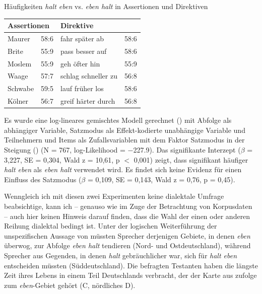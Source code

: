 \begin{exe}
        \ex\label{637} Häufigkeiten \textit{halt eben} vs. \textit{eben halt} in Assertionen und Direktiven\\[-1em]
    \begin{tabular}[t]{|l|l|l|l|}
    \hline
    \multicolumn{2}{|l|}{\textbf{Assertionen}} & \multicolumn{2}{l|}{\textbf{Direktive}}\\
    \hline
    Maurer & 58:6 & fahr später ab & 58:6\\
    \hline
    Brite & 55:9 & pass besser auf & 58:6\\
    \hline
    Moslem & 55:9 & geh öfter hin & 55:9\\
    \hline
    Waage & 57:7 & schlag schneller zu & 56:8\\
    \hline
    Schwabe & 59:5 & lauf früher los & 58:6\\
    \hline
    Kölner & 56:7 & greif härter durch & 56:8\\
    \hline
    \end{tabular}
\end{exe}
Es wurde eine log-lineares gemischtes Modell gerechnet (\citealt{Baayen2008}) mit Abfolge als abhängiger Variable, Satzmodus als Effekt-kodierte unabhängige Variable und Teilnehmern und Items als Zufallsvariablen mit dem Faktor Satzmodus in der Steigung (\citealt{Barr2013}) (N = 767, log-Likelihood = $\minus$227.9). Das signifikante Interzept ($\beta$ = 3,227, SE = 0,304, Wald z = 10,61, p $<$ 0,001) zeigt, dass signifikant häufiger \textit{halt eben} als \textit{eben halt} verwendet wird. Es findet sich keine Evidenz für einen Einfluss des Satzmodus ($\beta$ = 0,109, SE = 0,143, Wald z = 0,76, p = 0,45).

Wenngleich ich mit diesen zwei Experimenten keine dialektale Umfrage beabsichtige, kann ich – genauso wie im Zuge der Betrachtung von Korpusdaten – auch hier keinen Hinweis darauf finden, dass die Wahl der einen oder anderen Reihung dialektal bedingt ist. Unter der logischen Weiterführung der unspezifischen Aussage von \citet{Elspass2005} müssten Sprecher derjenigen Gebiete, in denen \textit{eben} überwog, zur Abfolge \textit{eben halt} tendieren (Nord- und Ostdeutschland), während Sprecher aus Gegenden, in denen \textit{halt} gebräuchlicher war, sich für \textit{halt eben} entscheiden müssten (Süddeutschland). Die befragten Testanten haben die längste Zeit ihres Lebens in einem Teil Deutschlands verbracht, der der Karte aus \citet{Eichhoff1978} zufolge zum \textit{eben}-Gebiet gehört (C, nördliches D).

